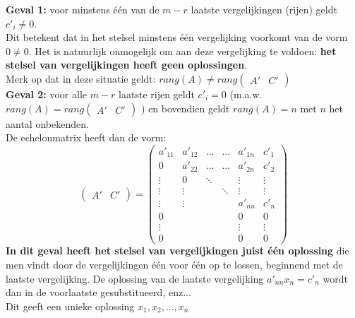 \begin{framed} 
	{\bf Geval 1:} voor minstens \'{e}\'{e}n van de $m-r$ laatste vergelijkingen (rijen) geldt $c'_{i} \neq 0$.\\ Dit betekent dat in het stelsel minstens \'{e}\'{e}n vergelijking voorkomt van de vorm $0 \neq 0$. Het is natuurlijk onmogelijk om aan deze vergelijking te voldoen: {\bf het stelsel van vergelijkingen heeft geen oplossingen}.\\
	Merk op dat in deze situatie geldt: $rang(A) \neq rang \left( \begin{array}{c|c} A' & C' \end{array} \right)$ \\
	
	{\bf Geval 2:} voor alle $m-r$ laatste rijen geldt $c'_{i}=0$ (m.a.w. $rang(A) = rang \left( \begin{array}{c|c} A' & C' \end{array} \right)$ ) en bovendien geldt $rang(A)=n$ met $n$ het aantal onbekenden. \\
	De echelonmatrix heeft dan de vorm:
	\[
	\left( \begin{array}{c|c} A' & C' \end{array} \right) = 
	\left(
	\begin{array}{ccccc|c}
	a'_{11} & a'_{12} & \ldots & \ldots & a'_{1n} & c'_{1} \\
	0 & a'_{22} & \ldots & \ldots & a'_{2n} & c'_{2} \\
	\vdots & 0 & \ddots &  & \vdots & \vdots \\
	\vdots & \vdots & & \ddots & \vdots & \vdots \\
	\vdots & \vdots & & & a'_{nn} & c'_{n} \\
	0 & & & & 0 & 0 \\
	\vdots & & & & \vdots & \vdots \\
	0 & & & & 0 & 0
	\end{array} 
	\right) 
	\]
	{\bf In dit geval heeft het stelsel van vergelijkingen juist \'{e}\'{e}n oplossing} die men vindt door de vergelijkingen \'{e}\'{e}n voor \'{e}\'{e}n op te lossen, beginnend met de laatste vergelijking. De oplossing van de laatste vergelijking $a'_{nn} x_{n}=c'_{n}$ wordt dan in de voorlaatste gesubstitueerd, enz... \\
	Dit geeft een unieke oplossing $x_{1}, x_{2}, ... , x_{n}$ \\
	

\end{framed}
